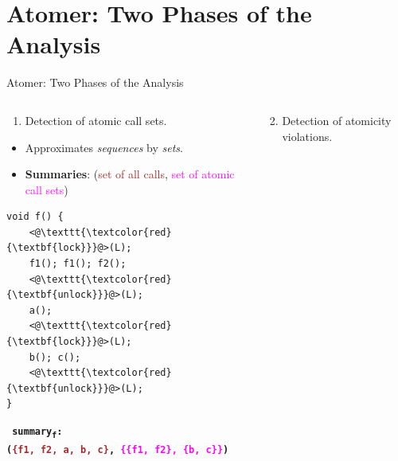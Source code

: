 \documentclass[10pt, hyperref={unicode}, aspectratio=169]{beamer}
\begin{document}
\section{Atomer: Two Phases of the Analysis}
\begin{frame}[fragile]{Atomer: Two Phases of the Analysis}
    \begin{columns}
        \begin{column}[T]{.5 \linewidth}
            \centering

            \begin{enumerate}
                \item
                    Detection of \alert{atomic call sets}.
            \end{enumerate}

            \begin{itemize}
                \item
                    Approximates \emph{sequences} by \emph{sets}.

                \item
                    \textbf{Summaries}: (\textcolor{brown}{set of all
                    calls}, \textcolor{magenta}{set of atomic call sets})
            \end{itemize}

            \begin{lstlisting}
void f() {
    <@\texttt{\textcolor{red}{\textbf{lock}}}@>(L);
    f1(); f1(); f2();
    <@\texttt{\textcolor{red}{\textbf{unlock}}}@>(L);
    a();
    <@\texttt{\textcolor{red}{\textbf{lock}}}@>(L);
    b(); c();
    <@\texttt{\textcolor{red}{\textbf{unlock}}}@>(L);
}
            \end{lstlisting}

            \textbf{\texttt{\footnotesize
                \alert{summary\textsubscript{f}}: \\
                (\textcolor{brown}{\{f1, f2, a, b, c\}},
                \textcolor{magenta}{\{\{f1, f2\}, \{b, c\}\}})
            }}
        \end{column}

        \begin{column}[T]{.5 \linewidth}
            \centering

            \begin{enumerate}\setcounter{enumi}{1}
                \item
                    Detection of \alert{atomicity violations}.
            \end{enumerate}


\end{column}
\end{columns}
\end{frame}
\end{document}
